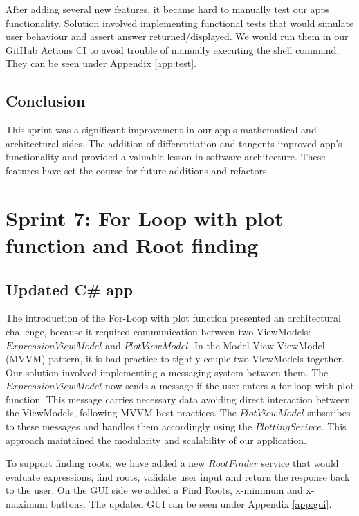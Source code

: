\documentclass[a4paper, oneside, 11pt]{report}
\begin{document}
After adding several new features, it became hard to manually test our apps functionality. Solution involved implementing functional tests that would simulate user behaviour and assert answer returned/displayed. We would run them in our GitHub Actions CI to avoid trouble of manually executing the shell command. They can be seen under Appendix \ref{app:test}.

\subsection{Conclusion}
This sprint was a significant improvement in our app's mathematical and architectural sides. The addition of differentiation and tangents improved app's functionality and provided a valuable lesson in software architecture. These features have set the course for future additions and refactors.


\section{Sprint 7: For Loop with plot function and Root finding}

\subsection{Updated C\# app}
The introduction of the For-Loop with plot function presented an architectural challenge, because it required communication between two ViewModels: $ExpressionViewModel$ and $PlotViewModel$. In the Model-View-ViewModel (MVVM) pattern, it is bad practice to tightly couple two ViewModels together. Our solution involved implementing a messaging system between them. The $ExpressionViewModel$ now sends a message if the user enters a for-loop with plot function. This message carries necessary data avoiding direct interaction between the ViewModels, following MVVM best practices. The $PlotViewModel$ subscribes to these messages and handles them accordingly using the $PlottingSerivce$. This approach maintained the modularity and scalability of our application.

To support finding roots, we have added a new $RootFinder$ service that would evaluate expressions, find roots, validate user input and return the response back to the user. On the GUI side we added a Find Roots, x-minimum and x-maximum buttons. The updated GUI can be seen under Appendix \ref{app:gui}.
\end{document}
